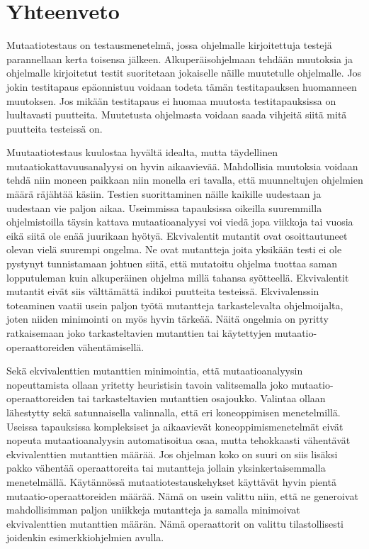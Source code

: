 \documentclass{tktltiki}
\begin{document}
\section{Yhteenveto}
Mutaatiotestaus on testausmenetelmä, jossa ohjelmalle kirjoitettuja testejä parannellaan kerta toisensa jälkeen. Alkuperäisohjelmaan tehdään muutoksia ja ohjelmalle kirjoitetut testit suoritetaan jokaiselle näille muutetulle ohjelmalle. Jos jokin testitapaus epäonnistuu voidaan todeta tämän testitapauksen huomanneen muutoksen. Jos mikään testitapaus ei huomaa muutosta testitapauksissa on luultavasti puutteita. Muutetusta ohjelmasta voidaan saada vihjeitä siitä mitä puutteita testeissä on. 

Muutaatiotestaus kuulostaa hyvältä idealta, mutta täydellinen mutaatiokattavuusanalyysi on hyvin aikaavievää. Mahdollisia muutoksia voidaan tehdä niin moneen paikkaan niin monella eri tavalla, että muunneltujen ohjelmien määrä räjähtää käsiin. Testien suorittaminen näille kaikille uudestaan ja uudestaan vie paljon aikaa. Useimmissa tapauksissa oikeilla suuremmilla ohjelmistoilla täysin kattava mutaatioanalyysi voi viedä jopa viikkoja tai vuosia eikä siitä ole enää juurikaan hyötyä. Ekvivalentit mutantit ovat osoittautuneet olevan vielä suurempi ongelma. Ne ovat mutantteja joita yksikään testi ei ole pystynyt tunnistamaan johtuen siitä, että mutatoitu ohjelma tuottaa saman lopputuleman kuin alkuperäinen ohjelma millä tahansa syötteellä. Ekvivalentit mutantit eivät siis välttämättä indikoi puutteita testeissä. Ekvivalenssin toteaminen vaatii usein paljon työtä mutantteja tarkastelevalta ohjelmoijalta, joten niiden minimointi on myös hyvin tärkeää. Näitä ongelmia on pyritty ratkaisemaan joko tarkasteltavien mutanttien tai käytettyjen mutaatio-operaattoreiden vähentämisellä. 

Sekä ekvivalenttien mutanttien minimointia, että mutaatioanalyysin nopeuttamista ollaan yritetty heuristisin tavoin valitsemalla joko mutaatio-operaattoreiden tai tarkasteltavien mutanttien osajoukko. Valintaa ollaan lähestytty sekä satunnaisella valinnalla, että eri koneoppimisen menetelmillä. Useissa tapauksissa kompleksiset ja aikaavievät koneoppimismenetelmät eivät nopeuta mutaatioanalyysin automatisoitua osaa, mutta tehokkaasti vähentävät ekvivalenttien mutanttien määrää. Jos ohjelman koko on suuri on siis lisäksi pakko vähentää operaattoreita tai mutantteja jollain yksinkertaisemmalla menetelmällä. Käytännössä mutaatiotestauskehykset käyttävät hyvin pientä mutaatio-operaattoreiden määrää. Nämä on usein valittu niin, että ne generoivat mahdollisimman paljon uniikkeja mutantteja ja samalla minimoivat ekvivalenttien mutanttien määrän. Nämä operaattorit on valittu tilastollisesti joidenkin esimerkkiohjelmien avulla.

{}

\end{document}
